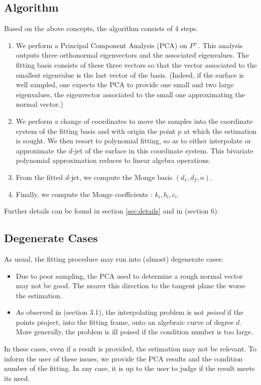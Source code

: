 \subsection{Algorithm}
%
Based on the above concepts, the algorithm consists of 4 steps.
%
\begin{enumerate}
\item
We perform a Principal Component Analysis (PCA) on $P^+$. This
analysis outputs three orthonormal eigenvectors and the associated
eigenvalues.  The fitting basis consists of these three vectors so
that the vector associated to the smallest eigenvalue is the last
vector of the basis. (Indeed, if the surface is well sampled, one
expects the PCA to provide one small and two large eigenvalues, the
eigenvector associated to the small one approximating the normal
vector.)
\item
We perform a change of coordinates to move the samples into the
coordinate system of the fitting basis and with origin the point $p$
at which the estimation is sought. We then resort to polynomial
fitting, so as to either interpolate or approximate the $d$-jet of the
surface in this coordinate system. This bivariate polynomial
approximation reduces to linear algebra operations.
\item
From the fitted $d$-jet, we compute the Monge basis $(d_1,d_2,n)$.
\item
Finally, we compute the Monge coefficients : $k_i, b_i, c_i$.
\end{enumerate}

Further details can be found in section \ref{sec:details} and in
\cite{cgal:cp-edqpf-05} (section 6).

\subsection{Degenerate Cases\label{sec:deg-cases}}

As usual, the  fitting procedure may run into (almost) degenerate
cases:
\begin{itemize}
\item Due to poor sampling, the PCA used to determine a rough normal
  vector may not be good. The nearer this direction to the tangent
  plane the worse the estimation.

\item As observed in \cite{cgal:cp-edqpf-05} (section 3.1), the
  interpolating problem is not {\em poised} if the points project,
  into the fitting frame, onto an algebraic curve of degree $d$. More
  generally, the problem is ill poised if the condition number is too
  large.
\end{itemize}
In these cases, even if a result is provided, the estimation may not
be relevant. To inform the user of these issues, we provide the PCA
results and the condition number of the fitting. In any case, it is up
to the user to judge if the result meets its need.



